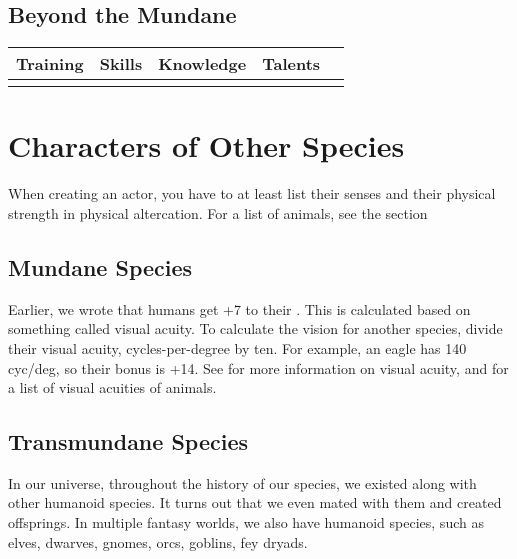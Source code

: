 \subsection{Beyond the Mundane}

\begin{center}
	\begin{xltabular}{\textwidth}{XXXXl}
		Training								&	Skills									& Knowledge								&  Talents & \\
		\hline
		\footnotesize \listFantasyTraining		&	\footnotesize	\listFantasySkills		&\footnotesize \listFantasyKnowledge	& \footnotesize  \listFantasyTalents 	&  \\
	\end{xltabular}
\end{center}


\section{Characters of Other Species}

When creating an actor, you have to at least list their senses and their physical strength in physical altercation.
For a list of animals, see the section

\subsection[Mundane Species]{Mundane Species}
\label{subsec:chargen_mundane}

Earlier, we wrote that humans get +7 to their .
This is calculated based on something called visual acuity.
To calculate the vision for another species, divide their visual acuity, cycles-per-degree by ten.
For example, an eagle has 140 cyc/deg, so their bonus is +14.
See \cite{caves_acuityview_2018} for more information on visual acuity,
and \cite{noauthor_list_2019} for a list of visual acuities of animals.


\subsection[Transmundane Species]{Transmundane Species}
\label{subsec:chargen_transmundane_species}

In our universe, throughout the history of our species, we existed along with other humanoid species.
It turns out that we even mated with them and created offsprings.
In multiple fantasy worlds, we also have humanoid species,
such as elves, dwarves, gnomes, orcs, goblins, fey dryads.



